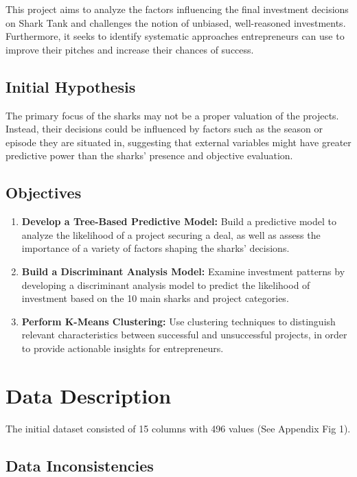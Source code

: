 \documentclass{article}
\begin{document}
This project aims to analyze the factors influencing the final investment decisions on Shark Tank and challenges the notion of unbiased, well-reasoned investments. Furthermore, it seeks to identify systematic approaches entrepreneurs can use to improve their pitches and increase their chances of success.

\subsection{Initial Hypothesis}

The primary focus of the sharks may not be a proper valuation of the projects. Instead, their decisions could be influenced by factors such as the season or episode they are situated in, suggesting that external variables might have greater predictive power than the sharks’ presence and objective evaluation.

\subsection{Objectives}

\begin{enumerate}
    \item \textbf{Develop a Tree-Based Predictive Model:} Build a predictive model to analyze the likelihood of a project securing a deal, as well as assess the importance of a variety of factors shaping the sharks' decisions.
    \item \textbf{Build a Discriminant Analysis Model:} Examine investment patterns by developing a discriminant analysis model to predict the likelihood of investment based on the 10 main sharks and project categories.
    \item \textbf{Perform K-Means Clustering:} Use clustering techniques to distinguish relevant characteristics between successful and unsuccessful projects, in order to provide actionable insights for entrepreneurs.
\end{enumerate}

\section{Data Description}

The initial dataset consisted of 15 columns with 496 values (See Appendix Fig 1).

\subsection{Data Inconsistencies}
\end{document}
